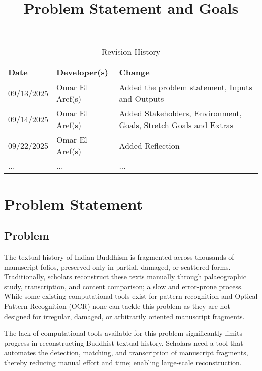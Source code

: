 \documentclass{article}
\title{Problem Statement and Goals\\\progname}
\author{\authname}
\date{}
\begin{document}
\maketitle

\begin{table}[hp]
\caption{Revision History} \label{TblRevisionHistory}
\begin{tabularx}{\textwidth}{llX}
\toprule
\textbf{Date} & \textbf{Developer(s)} & \textbf{Change}\\
\midrule
09/13/2025 & Omar El Aref(s) & Added the problem statement, Inputs and Outputs\\
09/14/2025 & Omar El Aref(s) & Added Stakeholders, Environment, Goals, Stretch Goals and Extras\\
09/22/2025 & Omar El Aref(s) & Added Reflection\\
... & ... & ...\\
\bottomrule
\end{tabularx}
\end{table}

\section{Problem Statement}



\subsection{Problem}
The textual history of Indian Buddhism is fragmented across thousands of manuscript folios, preserved only in partial, damaged, or scattered forms. Traditionally, scholars reconstruct these texts manually through palaeographic study, transcription, and content comparison; a slow and error-prone process. While some existing computational tools exist for pattern recognition and Optical Pattern Recognition (OCR) none can tackle this problem as they are not designed for irregular, damaged, or arbitrarily oriented manuscript fragments. 

The lack of computational tools available for this problem significantly limits progress in reconstructing Buddhist textual history. Scholars need a tool that automates the detection, matching, and transcription of manuscript fragments, thereby reducing manual effort and time; enabling large-scale reconstruction.
\end{document}
